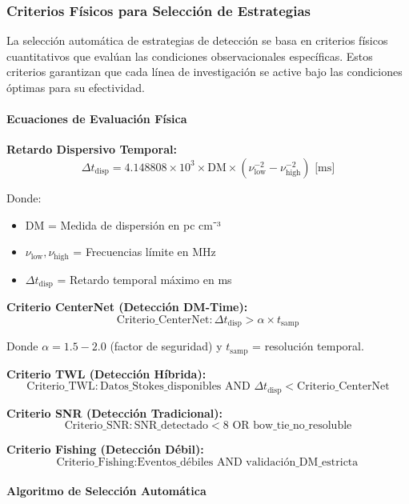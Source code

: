 \subsubsection{Criterios Físicos para Selección de Estrategias}

La selección automática de estrategias de detección se basa en criterios físicos cuantitativos que evalúan las condiciones observacionales específicas. Estos criterios garantizan que cada línea de investigación se active bajo las condiciones óptimas para su efectividad.

\paragraph{Ecuaciones de Evaluación Física}

\textbf{Retardo Dispersivo Temporal:}
\[
\Delta t_{\text{disp}} = 4.148808 \times 10^3 \times \text{DM} \times (\nu_{\text{low}}^{-2} - \nu_{\text{high}}^{-2}) \text{ [ms]}
\]

Donde:
\begin{itemize}
\item $\text{DM}$ = Medida de dispersión en pc cm⁻³
\item $\nu_{\text{low}}, \nu_{\text{high}}$ = Frecuencias límite en MHz
\item $\Delta t_{\text{disp}}$ = Retardo temporal máximo en ms
\end{itemize}

\textbf{Criterio CenterNet (Detección DM-Time):}
\[
\text{Criterio\_CenterNet}: \Delta t_{\text{disp}} > \alpha \times t_{\text{samp}}
\]

Donde $\alpha = 1.5-2.0$ (factor de seguridad) y $t_{\text{samp}}$ = resolución temporal.

\textbf{Criterio TWL (Detección Híbrida):}
\[
\text{Criterio\_TWL}: \text{Datos\_Stokes\_disponibles} \text{ AND } \Delta t_{\text{disp}} < \text{Criterio\_CenterNet}
\]

\textbf{Criterio SNR (Detección Tradicional):}
\[
\text{Criterio\_SNR}: \text{SNR\_detectado} < 8 \text{ OR } \text{bow\_tie\_no\_resoluble}
\]

\textbf{Criterio Fishing (Detección Débil):}
\[
\text{Criterio\_Fishing}: \text{Eventos\_débiles} \text{ AND } \text{validación\_DM\_estricta}
\]

\paragraph{Algoritmo de Selección Automática}

